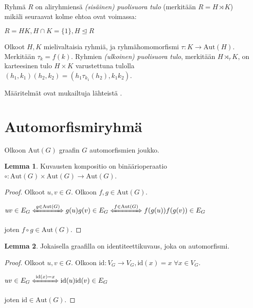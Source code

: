 \documentclass[a4paper, 12pt]{article}
\theoremstyle{definition}
\newtheorem{lemma}{Lemma}
\theoremstyle{plain}
\begin{document}
Ryhmä $R$ on aliryhmiensä \emph{(sisäinen) puolisuora tulo} (merkitään $R = H \rtimes K$) mikäli seuraavat kolme ehtoa ovat voimassa:
\begin{center}
\begin{math}
R = HK,  H \cap K = \{ 1\}, H \trianglelefteq R
\end{math}
\end{center}

Olkoot $H, K$ mielivaltaisia ryhmiä, ja ryhmähomomorfismi $\tau: K \rightarrow \mathrm{Aut}(H)$. Merkitään $\tau_k = f(k)$. Ryhmien \emph{(ulkoinen) puolisuora tulo}, merkitään $H \rtimes_\tau K$, on karteesinen tulo $H \times K$ varustettuna tulolla $(h_1, k_1)(h_2, k_2) = (h_1\tau_{k_1}(h_2), k_1k_2)$.

Määritelmät ovat mukailtuja lähteistä \cite{ryhmateoria}\cite{grapththeory}.

\section{Automorfismiryhmä}

Olkoon $\mathrm{Aut}(G)$ graafin $G$ automorfismien joukko.

\begin{lemma}
\label{lemma:binaarirelaatio}
Kuvausten kompositio on binäärioperaatio $\circ : \mathrm{Aut}(G) \times \mathrm{Aut}(G) \rightarrow \mathrm{Aut}(G)$.
\begin{proof}
Olkoot $u, v \in G$. Olkoon $f, g \in \mathrm{Aut}(G)$.
\begin{center}
\begin{math}
uv \in E_G \xLeftrightarrow{g \in \mathrm{Aut}(G)} g(u)g(v) \in E_G  \xLeftrightarrow{f \in \mathrm{Aut}(G)} f(g(u))f(g(v)) \in E_G 
\end{math}
\end{center}
joten $f \circ g \in \mathrm{Aut}(G)$.
\end{proof}
\end{lemma}

\begin{lemma}
\label{lemma:identiteetti}
Jokaisella graafilla on identiteettikuvaus, joka on automorfismi.
\begin{proof}
Olkoot $u, v \in G$. Olkoon $\mathrm{id}: V_G \rightarrow V_G, \mathrm{id}(x) = x \; \forall x \in V_G$.
\begin{center}
\begin{math}
uv \in E_G \xLeftrightarrow{\mathrm{id}(x) = x} \mathrm{id}(u)\mathrm{id}(v) \in E_G  
\end{math}
\end{center}
joten $\mathrm{id} \in \mathrm{Aut}(G)$.
\end{proof}
\end{lemma}
\end{document}
